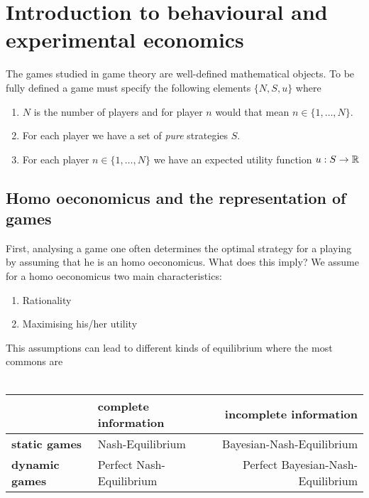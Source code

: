 

\chapter{Introduction to behavioural and experimental economics}

The games studied in game theory are well-defined mathematical objects. To be fully defined a game must specify the following elements $\{ N, S, u \}$ where

	\begin{enumerate}
		\item $N$ is the number of players and for player $n$ would that mean $n \in \{ 1, \dotsc, N \}$.
		\item For each player we have a set of \textit{pure} strategies $S$.
		\item For each player $n \in \{1, \dotsc, N \}$ we have an expected utility function $u : S \rightarrow \mathbb{R}$
	\end{enumerate}


\section{Homo oeconomicus and the representation of games} 
First, analysing a game one often determines the optimal strategy for a playing by assuming that he is an homo oeconomicus. What does this imply? We assume for a homo oeconomicus two main characteristics:
\begin{enumerate}
	\item Rationality
	\item Maximising his/her utility
\end{enumerate}


This assumptions can lead to different kinds of equilibrium where the most commons are \\ \\
\begin{tabular}{|l|l|r|}
	\hline\hline
  			& {\textbf{complete information}} & {\textbf{incomplete information}} \\
                                                    \hline
   \textbf{static games} & Nash-Equilibrium & Bayesian-Nash-Equilibrium\arrayrulewidth2pt \\
                                               \cline{1-3}
   \textbf{dynamic games} & Perfect Nash-Equilibrium & Perfect Bayesian-Nash-Equilibrium \\ \hline\hline
\end{tabular}

